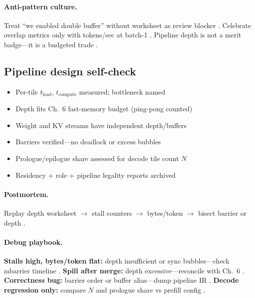 \paragraph{Anti-pattern culture.}
Treat ``we enabled double buffer'' without worksheet as review blocker \citep{yirage2026,dao2022flashattention,chen2020compilerbasedhardw}.
Celebrate overlap metrics only with tokens/sec at batch-1 \citep{patel2025llminference,taxbreak2026,memoryfloor2026}.
Pipeline depth is not a merit badge---it is a budgeted trade \citep{memoryfloor2026,semianalysis2024tma,shah2024flashattention3}.

\subsection{Pipeline design self-check}
\begin{itemize}
\item[$\square$] Per-tile $t_{\mathrm{load}}$, $t_{\mathrm{compute}}$ measured; bottleneck named
\item[$\square$] Depth fits Ch.~6 fast-memory budget (ping-pong counted)
\item[$\square$] Weight and KV streams have independent depth/buffers
\item[$\square$] Barriers verified---no deadlock or excess bubbles
\item[$\square$] Prologue/epilogue share assessed for decode tile count $N$
\item[$\square$] Residency + role + pipeline legality reports archived
\end{itemize}

\paragraph{Postmortem.}
Replay depth worksheet $\rightarrow$ stall counters $\rightarrow$ bytes/token $\rightarrow$ bisect barrier or depth \citep{shah2024flashattention3,yirage2026,taxbreak2026,memoryfloor2026}.

\paragraph{Debug playbook.}
\textbf{Stalls high, bytes/token flat:} depth insufficient or sync bubbles---check mbarrier timeline \citep{semianalysis2024tma,patel2025llminference}.
\textbf{Spill after merge:} depth excessive---reconcile with Ch.~6 \citep{memoryfloor2026,yirage2026}.
\textbf{Correctness bug:} barrier order or buffer alias---dump pipeline IR \citep{chen2020compilerbasedhardw,shah2024flashattention3}.
\textbf{Decode regression only:} compare $N$ and prologue share vs prefill config \citep{taxbreak2026,kwon2023vllm}.

